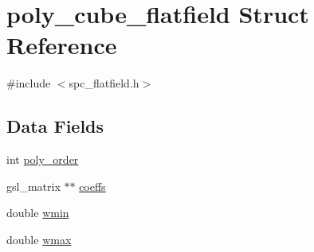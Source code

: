 \hypertarget{structpoly__cube__flatfield}{
\section{poly\_\-cube\_\-flatfield Struct Reference}
\label{structpoly__cube__flatfield}
}


{\ttfamily \#include $<$spc\_\-flatfield.h$>$}\subsection*{Data Fields}
\begin{DoxyCompactItemize}
\item 
int \hyperlink{structpoly__cube__flatfield_a43ded1d19ab5c7a6d34ffc75788e6fdf}{poly\_\-order}
\item 
gsl\_\-matrix $\ast$$\ast$ \hyperlink{structpoly__cube__flatfield_a5e941be5d850641c8f11e35e48d9266e}{coeffs}
\item 
double \hyperlink{structpoly__cube__flatfield_a1ffb6722301a4c505bf12fa1b465ba40}{wmin}
\item 
double \hyperlink{structpoly__cube__flatfield_a84506df8267a17616949e9f34424dd62}{wmax}
\end{DoxyCompactItemize}


